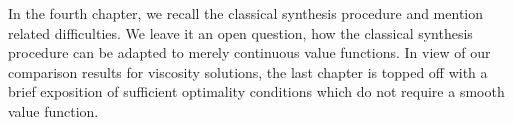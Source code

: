 In the fourth chapter, we recall the classical synthesis procedure and mention related difficulties. We leave it an open question, how the classical synthesis procedure can be adapted to merely continuous value functions. In view of our comparison results for viscosity solutions, the last chapter is topped off with a brief exposition of sufficient optimality conditions which do not require a smooth value function.





